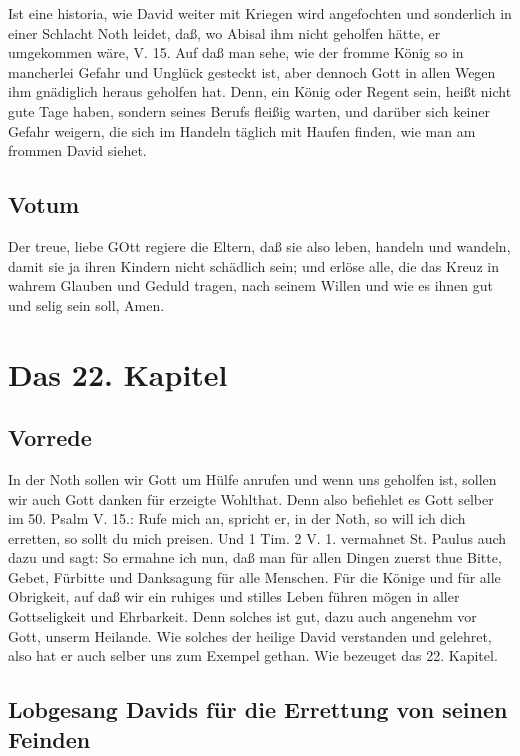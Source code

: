 Ist eine historia, wie David weiter mit Kriegen wird angefochten und sonderlich in einer Schlacht Noth leidet, daß, wo Abisal ihm nicht geholfen hätte, er umgekommen wäre, V. 15. Auf daß man sehe, wie der fromme König so in mancherlei Gefahr und Unglück gesteckt ist, aber dennoch Gott in allen Wegen ihm gnädiglich heraus geholfen hat. Denn, ein König oder Regent sein, heißt nicht gute Tage haben, sondern seines Berufs fleißig warten, und darüber sich keiner Gefahr weigern, die sich im Handeln täglich mit Haufen finden, wie man am frommen David siehet.

\section{Votum}

Der treue, liebe GOtt regiere die Eltern, daß sie also leben, handeln und wandeln, damit
 sie ja ihren Kindern nicht schädlich sein; und erlöse alle, die das Kreuz in wahrem Glauben und Geduld tragen, nach seinem Willen und wie es ihnen gut und selig sein soll, Amen.

\chapter{Das 22. Kapitel}

\section{Vorrede}

In der Noth sollen wir Gott um Hülfe anrufen und wenn uns geholfen ist, sollen wir auch Gott danken für erzeigte Wohlthat. Denn also befiehlet es Gott selber im 50. Psalm V. 15.: Rufe mich an, spricht er, in der Noth, so will ich dich erretten, so sollt du mich preisen. Und 1 Tim. 2 V. 1. vermahnet St. Paulus auch dazu und sagt: So ermahne ich nun, daß man für allen Dingen zuerst thue Bitte, Gebet, Fürbitte und Danksagung für alle Menschen. Für die Könige und für alle Obrigkeit, auf daß wir ein ruhiges und stilles Leben führen mögen in aller Gottseligkeit und Ehrbarkeit. Denn solches ist gut, dazu auch angenehm vor Gott, unserm Heilande. Wie solches der heilige David verstanden und gelehret, also hat er auch selber uns zum Exempel gethan. Wie bezeuget das 22. Kapitel.

\section{Lobgesang Davids für die Errettung von seinen Feinden}

